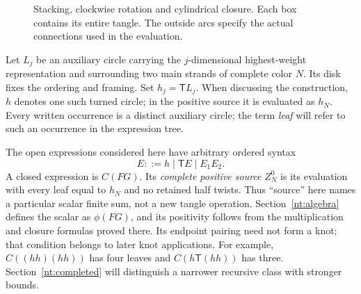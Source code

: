 \documentclass[11pt]{article}
\numberwithin{equation}{section}
\theoremstyle{definition}\newtheorem{definition}[theorem]{Definition}
\theoremstyle{remark}\newtheorem{remark}[theorem]{Remark}
\newcommand{\Turn}{\mathsf T}\newcommand{\Cheb}{\mathsf C}
\begin{document}
\begin{figure}[ht]
\centering
\caption{Stacking, clockwise rotation and cylindrical closure. Each box
contains its entire tangle. The outside arcs specify the actual
connections used in the evaluation.}\label{nt:operations}
\end{figure}

Let $L_j$ be an auxiliary circle carrying the $j$-dimensional
highest-weight representation and surrounding two main strands of
complete color $N$. Its disk fixes the ordering and framing. Set
$h_j=\Turn L_j$. When discussing the construction, $h$ denotes one
such turned circle; in the positive source it is evaluated as $h_N$.
Every written occurrence is a distinct auxiliary circle; the term
\emph{leaf} will refer to such an occurrence in the expression tree.

The open expressions considered here have arbitrary ordered syntax
\[
 E::=h\mid\Turn E\mid E_1E_2.
\]
A closed expression is $C(FG)$. Its \emph{complete positive source}
$Z_N^0$ is its evaluation with every leaf equal to $h_N$ and no retained
half twists. Thus ``source'' here names a particular scalar finite sum,
not a new tangle operation. Section~\ref{nt:algebra} defines the scalar
as $\phi(FG)$, and its positivity follows from the multiplication and
closure formulas proved there.
Its endpoint pairing need not form a knot; that condition belongs
to later knot applications. For example, $C((hh)(hh))$ has four
leaves and $C(h\Turn(hh))$ has three. Section~\ref{nt:completed}
will distinguish a narrower recursive class with stronger bounds.







\end{document}
